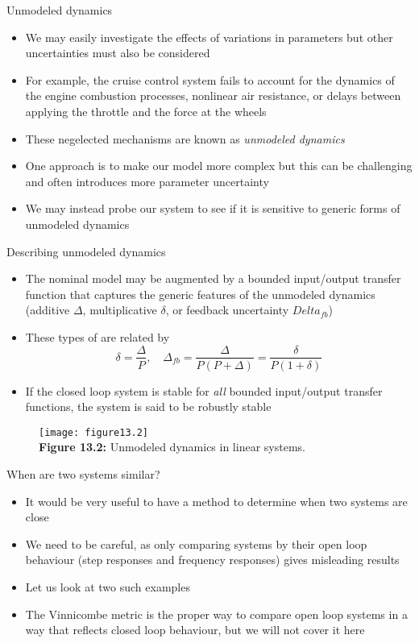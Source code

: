 \documentclass{beamer-control}
\begin{document}
\begin{frame}{Unmodeled dynamics}
\begin{itemize}
\item We may easily investigate the effects of variations in parameters but other uncertainties must also be considered
\item For example, the cruise control system fails to account for the dynamics of the engine combustion processes, nonlinear air resistance, or delays between applying the throttle and the force at the wheels
\item These negelected mechanisms are known as \textit{unmodeled dynamics}
\item One approach is to make our model more complex but this can be challenging and often introduces more parameter uncertainty
\item We may instead probe our system to see if it is sensitive to generic forms of unmodeled dynamics
\end{itemize}
\end{frame}


\begin{frame}{Describing unmodeled dynamics}
	\begin{itemize}
		\item The nominal model may be augmented by a bounded input/output transfer function that captures the generic features of the unmodeled dynamics (additive $\Delta$, multiplicative $\delta$, or feedback uncertainty $Delta_{fb}$)
		\item These types of  are related by
		\[\delta=\frac{\Delta}{P}, \quad \Delta_{fb} = \frac{\Delta}{P(P+\Delta)}=\frac{\delta}{P(1+\delta)}\]
		\item If the closed loop system is stable for \textit{all}  bounded input/output transfer functions, the system is said to be robustly stable
		
	\end{itemize}
\begin{figure}
	\centering
	\texttt{[image: figure13.2]}\\
	\vspace{-0.2cm}
	\textbf{Figure 13.2:} Unmodeled dynamics in linear systems.
\end{figure}
\end{frame}



\begin{frame}{When are two systems similar?}
	\begin{itemize}
		\item It would be very useful to have a method to determine when two systems are close
		\item We need to be careful, as only comparing systems by their open loop behaviour (step responses and frequency responses) gives misleading results
		\item Let us look at two such examples
		\item The Vinnicombe metric is the proper way to compare open loop systems in a way that reflects closed loop behaviour, but we will not cover it here 
	\end{itemize}
\end{frame}
\end{document}

